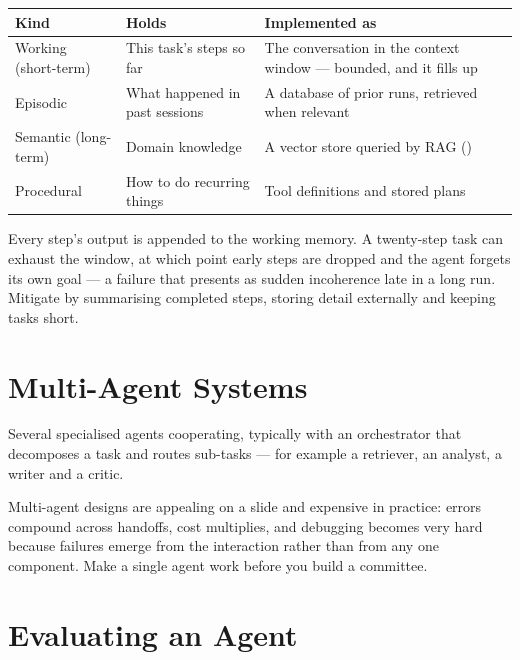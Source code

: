 \begin{longtable}{@{}L{3.1cm}L{4.5cm}L{6.5cm}@{}}
\toprule
{}
\textbf{Kind} & \textbf{Holds} & \textbf{Implemented as} \\
\midrule
\endhead
Working (short-term) & This task's steps so far & The conversation in the context window --- bounded, and it fills up \\
Episodic & What happened in past sessions & A database of prior runs, retrieved when relevant \\
Semantic (long-term) & Domain knowledge & A vector store queried by RAG () \\
Procedural & How to do recurring things & Tool definitions and stored plans \\
\bottomrule
\end{longtable}

\begin{alertbox}
Every step's output is appended to the working memory. A twenty-step task can
exhaust the window, at which point early steps are dropped and the agent forgets
its own goal --- a failure that presents as sudden incoherence late in a long run.
Mitigate by summarising completed steps, storing detail externally and keeping
tasks short.
\end{alertbox}

\section{Multi-Agent Systems}

\begin{definitionbox}
Several specialised agents cooperating, typically with an orchestrator that
decomposes a task and routes sub-tasks --- for example a retriever, an analyst, a
writer and a critic.
\end{definitionbox}

\begin{conceptbox}
Multi-agent designs are appealing on a slide and expensive in practice: errors
compound across handoffs, cost multiplies, and debugging becomes very hard because
failures emerge from the interaction rather than from any one component. Make a
single agent work before you build a committee.
\end{conceptbox}

\section{Evaluating an Agent}

